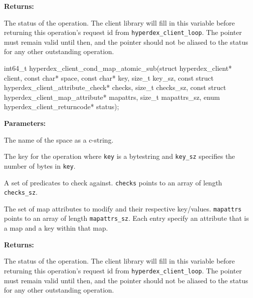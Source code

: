 \noindent\textbf{Returns:}
\begin{description}[labelindent=\widthof{{\texttt{status}}},leftmargin=*,noitemsep,nolistsep,align=right]
\item[\texttt{status}] The status of the operation.  The client library will fill in this variable before returning this operation's request id from \texttt{hyperdex\_client\_loop}.  The pointer must remain valid until then, and the pointer should not be aliased to the status for any other outstanding operation.
\end{description}

\funcsep
{}
\begin{ccode}
int64_t hyperdex_client_cond_map_atomic_sub(struct hyperdex_client* client,
                const char* space,
                const char* key, size_t key_sz,
                const struct hyperdex_client_attribute_check* checks, size_t checks_sz,
                const struct hyperdex_client_map_attribute* mapattrs, size_t mapattrs_sz,
                enum hyperdex_client_returncode* status);
\end{ccode}
\funcdesc 

\noindent\textbf{Parameters:}
\begin{description}[labelindent=\widthof{{\texttt{mapattrs}, \texttt{mapattrs\_sz}}},leftmargin=*,noitemsep,nolistsep,align=right]
\item[\texttt{space}] The name of the space as a c-string.
\item[\texttt{key}, \texttt{key\_sz}] The key for the operation where \texttt{key} is a bytestring and \texttt{key\_sz} specifies the number of bytes in \texttt{key}.
\item[\texttt{checks}, \texttt{checks\_sz}] A set of predicates to check against.  \texttt{checks} points to an array of length \texttt{checks\_sz}.
\item[\texttt{mapattrs}, \texttt{mapattrs\_sz}] The set of map attributes to modify and their respective key/values.  \texttt{mapattrs} points to an array of length \texttt{mapattrs\_sz}.  Each entry specify an attribute that is a map and a key within that map.
\end{description}

\noindent\textbf{Returns:}
\begin{description}[labelindent=\widthof{{\texttt{status}}},leftmargin=*,noitemsep,nolistsep,align=right]
\item[\texttt{status}] The status of the operation.  The client library will fill in this variable before returning this operation's request id from \texttt{hyperdex\_client\_loop}.  The pointer must remain valid until then, and the pointer should not be aliased to the status for any other outstanding operation.
\end{description}

